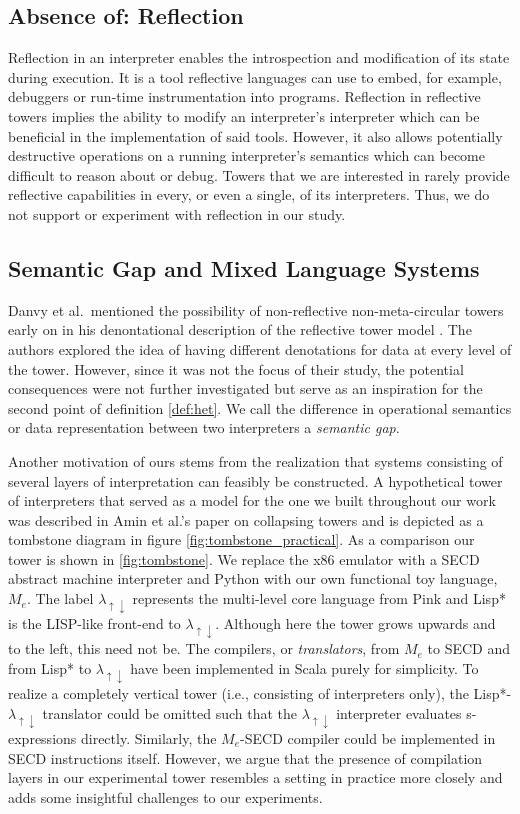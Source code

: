 \documentclass[a4paper,12pt,twoside,openright]{report}
\theoremstyle{definition}
\newcommand{\mslang}{$\lambda_{\uparrow\downarrow}$}
\newcommand{\mevl}{$M_{e}$}
\begin{document}
\subsection{Absence of: Reflection}
Reflection in an interpreter enables the introspection and modification of its state during execution. It is a tool reflective languages can use to embed, for example, debuggers or run-time instrumentation into programs. Reflection in reflective towers implies the ability to modify an interpreter's interpreter which can be beneficial in the implementation of said tools. However, it also allows potentially destructive operations on a running interpreter's semantics which can become difficult to reason about or debug. Towers that we are interested in rarely provide reflective capabilities in every, or even a single, of its interpreters. Thus, we do not support or experiment with reflection in our study.

\subsection{Semantic Gap and Mixed Language Systems}
Danvy et al.~mentioned the possibility of non-reflective non-meta-circular towers early on in his denontational description of the reflective tower model \cite{danvy1988intensions}. The authors explored the idea of having different denotations for data at every level of the tower. However, since it was not the focus of their study, the potential consequences were not further investigated but serve as an inspiration for the second point of definition \ref{def:het}. We call the difference in operational semantics or data representation between two interpreters a \textit{semantic gap}.

Another motivation of ours stems from the realization that systems consisting of several layers of interpretation can feasibly be constructed. A hypothetical tower of interpreters that served as a model for the one we built throughout our work was described in Amin et al.'s paper on collapsing towers \cite{amin2017collapsing} and is depicted as a tombstone diagram in figure \ref{fig:tombstone_practical}. As a comparison our tower is shown in \ref{fig:tombstone}. We replace the x86 emulator with a SECD abstract machine interpreter and Python with our own functional toy language, \mevl. The label \mslang{} represents the multi-level core language from Pink \cite{amin2017collapsing} and Lisp* is the LISP-like front-end to \mslang. Although here the tower grows upwards and to the left, this need not be. The compilers, or \textit{translators}, from \mevl{} to SECD and from Lisp* to \mslang{} have been implemented in Scala purely for simplicity. To realize a completely vertical tower (i.e., consisting of interpreters only), the Lisp*-\mslang{} translator could be omitted such that the \mslang{} interpreter evaluates s-expressions directly. Similarly, the \mevl-SECD compiler could be implemented in SECD instructions itself. However, we argue that the presence of compilation layers in our experimental tower resembles a setting in practice more closely and adds some insightful challenges to our experiments.
\end{document}

